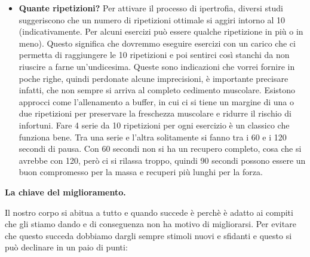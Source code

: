 \documentclass[12pt]{book} %
\begin{document}
\begin{itemize}
\item \textbf{Quante ripetizioni?}
Per attivare il processo di ipertrofia, diversi studi suggeriscono che un numero di ripetizioni ottimale si aggiri intorno al 10 (indicativamente. Per alcuni esercizi può essere qualche ripetizione in più o in meno). Questo significa che dovremmo eseguire esercizi con un carico che ci permetta di raggiungere le 10 ripetizioni e poi sentirci così stanchi da non riuscire a farne un'undicesima.
Queste sono indicazioni che vorrei fornire in poche righe, quindi perdonate alcune imprecisioni, è importante precisare infatti, che non sempre si arriva al completo cedimento muscolare. Esistono approcci come l'allenamento a buffer, in cui ci si tiene un margine di una o due ripetizioni per preservare la freschezza muscolare e ridurre il rischio di infortuni.
Fare 4 serie da 10 ripetizioni per ogni esercizio è un classico che funziona bene. Tra una serie e l'altra solitamente si fanno tra i 60 e i 120 secondi di pausa. Con 60 secondi non si ha un recupero completo, cosa che si avrebbe con 120, però ci si rilassa troppo, quindi 90 secondi possono essere un buon compromesso per la massa e recuperi più lunghi per la forza.
\end{itemize}

\textbf{La chiave del miglioramento.}

Il nostro corpo si abitua a tutto e quando succede è perchè è adatto ai compiti che gli stiamo dando e di conseguenza non ha motivo di migliorarsi.
Per evitare che questo succeda dobbiamo dargli sempre stimoli nuovi e sfidanti e questo si può declinare in un paio di punti:
\end{document}

